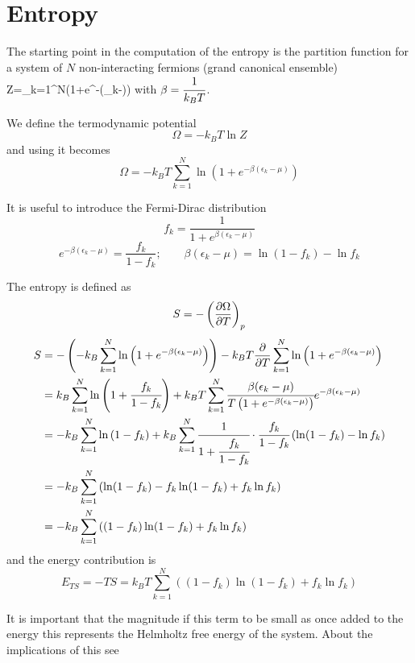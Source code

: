\section{Entropy}
\par{%
The starting point in the computation of the entropy is the partition function for a system of $N$ non-interacting fermions (grand canonical ensemble) \citep{Landau80}
}%
%
\be
\label{partitionZ}
Z=\prod_{k=1}^{N}\left(1+e^{-\beta(\epsilon_k-\mu)}\right)
\ee
with $\beta=\cfrac{1}{k_BT}$.
\par{We define the termodynamic potential}
\begin{equation}
 \Omega=-k_BT\ln Z
\end{equation}
and using  it becomes
\begin{equation}
 \Omega=-k_BT\sum_{k=1}^{N}\ln\left(1+e^{-\beta(\epsilon_k-\mu)}\right)
\end{equation}
\par{It is useful to introduce the Fermi-Dirac distribution}
\begin{equation}
 f_k=\frac{1}{1+e^{\beta\left(\epsilon_k-\mu\right)}}
\end{equation}
\begin{equation}
e^{-\beta\left(\epsilon_k-\mu\right)}=\frac{f_k}{1-f_k};\qquad \beta\left(\epsilon_k-\mu\right)=\ln (1-f_k)-\ln f_k
\end{equation}
\par{The entropy is defined as}
\begin{equation}
 S=-\left(\frac{\partial \Omega}{\partial T}\right)_p
\end{equation}
\begin{equation}
\begin{split}
 S&=-\left(-k_B\sum_{k=1}^{N}\ln\left(1+e^{-\beta(\epsilon_k-\mu)}\right)\right)-k_BT\frac{\partial }{\partial T}\sum_{k=1}^{N}\ln\left(1+e^{-\beta(\epsilon_k-\mu)}\right)
  \\&=k_B\sum_{k=1}^{N}\ln\left(1+\cfrac{f_k}{1-f_k}\right)+k_BT\sum_{k=1}^{N}\cfrac{\beta(\epsilon_k-\mu)}{T\left( 1+e^{-\beta(\epsilon_k-\mu)}\right)}e^{-\beta\left(\epsilon_k-\mu\right)}
\\&=-k_B\sum_{k=1}^{N}\ln\left(1-f_k\right)+k_B\sum_{k=1}^{N}\cfrac{1}{1+\cfrac{f_k}{1-f_k}}\cdot\cfrac{f_k}{1-f_k}\left(\ln(1-f_k)-\ln f_k\right)
\\&=-k_B\sum_{k=1}^{N}\left(\ln(1-f_k)-f_k\ln(1-f_k)+f_k \ln f_k \right)
\\&=-k_B\sum_{k=1}^{N}\left((1-f_k)\ln(1-f_k)+f_k \ln f_k\right)
\end{split}
\end{equation}
and the energy contribution is
\begin{equation}
 E_{TS}=-TS=k_BT\sum_{k=1}^{N}\left((1-f_k)\ln(1-f_k)+f_k \ln f_k\right)
\end{equation}
\par{It is important that the magnitude if this term to be small as once added to the energy this represents the Helmholtz free energy of the system. About the implications of this see \citep{Methfessel89,Marzari99}}
